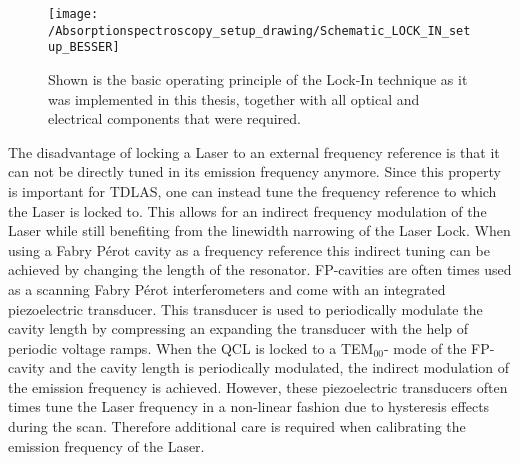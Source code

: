 \begin{figure}[H]
	\centering
	\texttt{[image: /Absorptionspectroscopy\_setup\_drawing/Schematic\_LOCK\_IN\_setup\_BESSER]}
	\caption{Shown is the basic operating principle of the Lock-In technique as it was implemented in this thesis, together with all optical and electrical components that were required.}
	\label{fig:LOCK-in_experimental_setup}
\end{figure}
\noindent
The disadvantage of locking a Laser to an external frequency reference is that it can not be directly tuned in its emission frequency anymore. Since this property is important for TDLAS, one can instead tune the frequency reference to which the Laser is locked to. This allows for an indirect frequency modulation of the Laser while still benefiting from the linewidth narrowing of the Laser Lock. When using a Fabry Pérot cavity as a frequency reference this indirect tuning can be achieved by changing the length of the resonator. FP-cavities are often times used as a scanning Fabry Pérot interferometers and come with an integrated piezoelectric transducer. This transducer is used to periodically modulate the cavity length by compressing an expanding the transducer with the help of periodic voltage ramps. When the QCL is locked to a TEM$_{00}$- mode of the FP-cavity and the cavity length is periodically modulated, the indirect modulation of the emission frequency is achieved. However, these piezoelectric transducers often times tune the Laser frequency in a non-linear fashion due to hysteresis effects during the scan. Therefore additional care is required when calibrating the emission frequency of the Laser.
